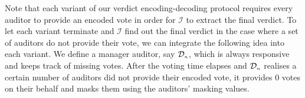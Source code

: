 Note that each variant of our verdict encoding-decoding protocol requires every auditor to provide an encoded vote  in order for $\mathcal{I}$ to extract the final verdict. To let each variant terminate and $\mathcal{I}$ find out the final verdict in the case where a  set of  auditors do not provide their vote, we can integrate the    following idea into each variant. We define a manager auditor, say $\mathcal{D}_{\scriptscriptstyle n}$, which is always responsive and keeps track of missing votes. After the voting time elapses and $\mathcal{D}_{\scriptscriptstyle n}$ realises a certain  number of auditors did not provide their encoded vote, it provides $0$ votes on their behalf and masks them using the  auditors' masking values. 









